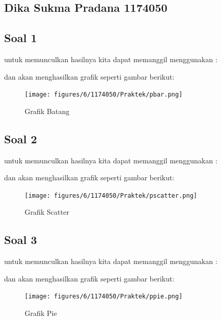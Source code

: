 	
	\subsection{Dika Sukma Pradana 1174050}
\subsection{Soal 1}


untuk memunculkan hasilnya kita dapat memanggil menggunakan :


dan akan menghasilkan grafik seperti gambar berikut:
\begin{figure}[H]
\centering
\texttt{[image: figures/6/1174050/Praktek/pbar.png]}
\caption{Grafik Batang}
\end{figure}

\subsection{Soal 2}


untuk memunculkan hasilnya kita dapat memanggil menggunakan :


dan akan menghasilkan grafik seperti gambar berikut:
\begin{figure}[H]
\centering
\texttt{[image: figures/6/1174050/Praktek/pscatter.png]}
\caption{Grafik Scatter}
\end{figure}

\subsection{Soal 3}


untuk memunculkan hasilnya kita dapat memanggil menggunakan :


dan akan menghasilkan grafik seperti gambar berikut:
\begin{figure}[H]
\centering
\texttt{[image: figures/6/1174050/Praktek/ppie.png]}
\caption{Grafik Pie}
\end{figure}

